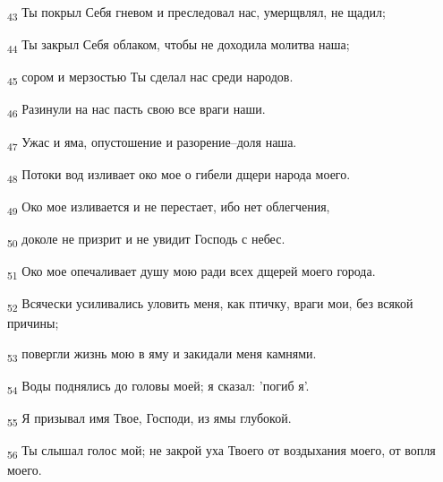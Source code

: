 \begin{tcolorbox}
\textsubscript{43} Ты покрыл Себя гневом и преследовал нас, умерщвлял, не щадил;
\end{tcolorbox}
\begin{tcolorbox}
\textsubscript{44} Ты закрыл Себя облаком, чтобы не доходила молитва наша;
\end{tcolorbox}
\begin{tcolorbox}
\textsubscript{45} сором и мерзостью Ты сделал нас среди народов.
\end{tcolorbox}
\begin{tcolorbox}
\textsubscript{46} Разинули на нас пасть свою все враги наши.
\end{tcolorbox}
\begin{tcolorbox}
\textsubscript{47} Ужас и яма, опустошение и разорение--доля наша.
\end{tcolorbox}
\begin{tcolorbox}
\textsubscript{48} Потоки вод изливает око мое о гибели дщери народа моего.
\end{tcolorbox}
\begin{tcolorbox}
\textsubscript{49} Око мое изливается и не перестает, ибо нет облегчения,
\end{tcolorbox}
\begin{tcolorbox}
\textsubscript{50} доколе не призрит и не увидит Господь с небес.
\end{tcolorbox}
\begin{tcolorbox}
\textsubscript{51} Око мое опечаливает душу мою ради всех дщерей моего города.
\end{tcolorbox}
\begin{tcolorbox}
\textsubscript{52} Всячески усиливались уловить меня, как птичку, враги мои, без всякой причины;
\end{tcolorbox}
\begin{tcolorbox}
\textsubscript{53} повергли жизнь мою в яму и закидали меня камнями.
\end{tcolorbox}
\begin{tcolorbox}
\textsubscript{54} Воды поднялись до головы моей; я сказал: 'погиб я'.
\end{tcolorbox}
\begin{tcolorbox}
\textsubscript{55} Я призывал имя Твое, Господи, из ямы глубокой.
\end{tcolorbox}
\begin{tcolorbox}
\textsubscript{56} Ты слышал голос мой; не закрой уха Твоего от воздыхания моего, от вопля моего.
\end{tcolorbox}
